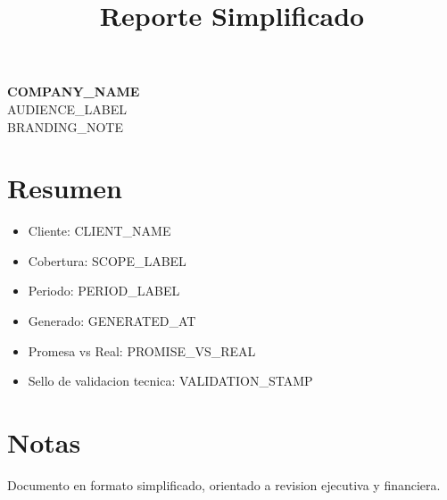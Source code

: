 \documentclass[11pt]{article}
\title{Reporte Simplificado}
\date{}
\begin{document}
\begin{center}
{\LARGE \textbf{{{COMPANY_NAME}}}}\\
\vspace{0.3cm}
{\large {{AUDIENCE_LABEL}}}\\
\small {{BRANDING_NOTE}}
\end{center}

\vspace{0.5cm}
\section*{Resumen}
\begin{itemize}
  \item Cliente: {{CLIENT_NAME}}
  \item Cobertura: {{SCOPE_LABEL}}
  \item Periodo: {{PERIOD_LABEL}}
  \item Generado: {{GENERATED_AT}}
  \item Promesa vs Real: {{PROMISE_VS_REAL}}
  \item Sello de validacion tecnica: {{VALIDATION_STAMP}}
\end{itemize}

\section*{Notas}
Documento en formato simplificado, orientado a revision ejecutiva y financiera.
\end{document}
